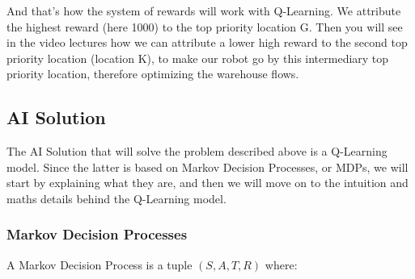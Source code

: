 \documentclass[]{book}
\begin{document}
And that's how the system of rewards will work with Q-Learning. We attribute the highest reward (here 1000) to the top priority location G. Then you will see in the video lectures how we can attribute a lower high reward to the second top priority location (location K), to make our robot go by this intermediary top priority location, therefore optimizing the warehouse flows.

\subsection{AI Solution}

The AI Solution that will solve the problem described above is a Q-Learning model. Since the latter is based on Markov Decision Processes, or MDPs, we will start by explaining what they are, and then we will move on to the intuition and maths details behind the Q-Learning model.

\subsubsection{Markov Decision Processes}

A Markov Decision Process is a tuple \((S, A, T, R)\) where:
\end{document}
